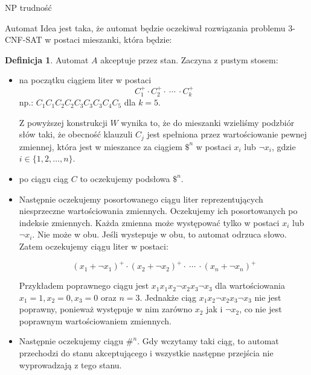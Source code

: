 \documentclass{article}
\theoremstyle{definition}
\newtheorem{definition}{Definicja}[section]
\theoremstyle{remark}
\begin{document}
\begin{section}{NP trudność}
 \begin{subsection}{Automat}
     Idea jest taka, że automat będzie oczekiwał rozwiązania problemu 3-CNF-SAT w
     postaci mieszanki, która będzie:

     \begin{definition}
         Automat $A$ akceptuje przez stan. Zaczyna z pustym stosem:
         \begin{itemize}

             \item na początku ciągiem liter w postaci
                   \[ C_1^+ \cdot C_2^+ \cdot \ \cdots \ \cdot C_k^+ \]
                   np.: $C_1 C_1 C_2 C_2 C_3 C_3 C_3 C_4 C_5$ dla $k = 5$.

                   Z powyższej konstrukcji \(W\) wynika to, że do mieszanki wzieliśmy podzbiór
                   słów taki, że obecność klauzuli $C_j$ jest spełniona przez wartościowanie
                   pewnej zmiennej, która jest w mieszance za ciągiem $ \$^n $ w postaci $ x_i $
                   lub $ \neg x_i $, gdzie $ i \in \{1, 2, \ldots, n\} $.

             \item po ciągu ciąg $C$ to oczekujemy podsłowa $ \$^n $.

             \item Następnie oczekujemy posortowanego ciągu liter reprezentujących niesprzeczne
                   wartościowania zmiennych. Oczekujemy ich posortowanych po indeksie zmiennych.
                   Każda zmienna może występować tylko w postaci $x_i$ lub $ \neg x_i$. Nie może w
                   obu. Jeśli wystepuje w obu, to automat odrzuca słowo. Zatem oczekujemy ciągu
                   liter w postaci:

                   \[ (x_1 + \neg x_1)^+ \cdot (x_2 + \neg x_2)^+ \cdot \ \cdots \ \cdot (x_n + \neg x_n)^+ \]

                   Przykładem poprawnego ciągu jest $x_1 x_1 x_2 \neg x_2 x_3 \neg x_3$ dla
                   wartościowania $x_1 = 1, x_2 = 0, x_3 = 0$ oraz $n = 3$. Jednakże ciąg $x_1 x_2
                       \neg x_2 x_3 \neg x_3$ nie jest poprawny, ponieważ występuje w nim zarówno
                   $x_2$ jak i $\neg x_2$, co nie jest poprawnym wartościowaniem zmiennych.

             \item Następnie oczekujemy ciągu $ \#^n$. Gdy wczytamy taki ciąg, to automat
                   przechodzi do stanu akceptującego i wszystkie następne przejścia nie
                   wyprowadzają z tego stanu.


\end{itemize}
\end{definition}
\end{subsection}
\end{section}
\end{document}
